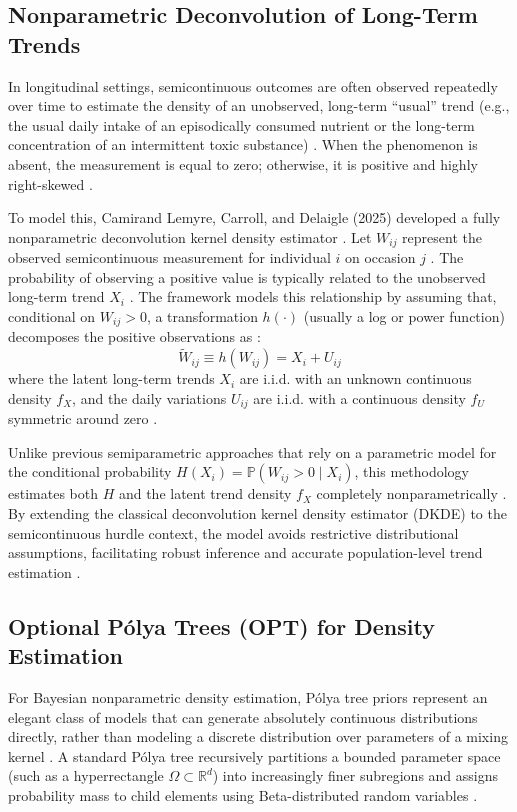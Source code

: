 \subsection{Nonparametric Deconvolution of Long-Term Trends}

In longitudinal settings, semicontinuous outcomes are often observed repeatedly over time to estimate the density of an unobserved, long-term ``usual'' trend (e.g., the usual daily intake of an episodically consumed nutrient or the long-term concentration of an intermittent toxic substance) \cite{lemyre2025}. When the phenomenon is absent, the measurement is equal to zero; otherwise, it is positive and highly right-skewed \cite{lemyre2025}.

To model this, Camirand Lemyre, Carroll, and Delaigle (2025) developed a fully nonparametric deconvolution kernel density estimator \cite{lemyre2025, delaigle2008}. Let $W_{ij}$ represent the observed semicontinuous measurement for individual $i$ on occasion $j$ \cite{lemyre2025}. The probability of observing a positive value is typically related to the unobserved long-term trend $X_i$ \cite{lemyre2025}. The framework models this relationship by assuming that, conditional on $W_{ij} > 0$, a transformation $h(\cdot)$ (usually a log or power function) decomposes the positive observations as \cite{lemyre2025}:
\[
\tilde{W}_{ij} \equiv h(W_{ij}) = X_i + U_{ij}
\]
where the latent long-term trends $X_i$ are i.i.d. with an unknown continuous density $f_X$, and the daily variations $U_{ij}$ are i.i.d. with a continuous density $f_U$ symmetric around zero \cite{lemyre2025}. 

Unlike previous semiparametric approaches that rely on a parametric model for the conditional probability $H(X_i) = \mathbb{P}(W_{ij} > 0 \mid X_i)$, this methodology estimates both $H$ and the latent trend density $f_X$ completely nonparametrically \cite{lemyre2025}. By extending the classical deconvolution kernel density estimator (DKDE) to the semicontinuous hurdle context, the model avoids restrictive distributional assumptions, facilitating robust inference and accurate population-level trend estimation \cite{lemyre2025}.

\subsection{Optional Pólya Trees (OPT) for Density Estimation}

For Bayesian nonparametric density estimation, Pólya tree priors represent an elegant class of models that can generate absolutely continuous distributions directly, rather than modeling a discrete distribution over parameters of a mixing kernel \cite{wong2010, ma2017}. A standard Pólya tree recursively partitions a bounded parameter space (such as a hyperrectangle $\Omega \subset \mathbb{R}^d$) into increasingly finer subregions and assigns probability mass to child elements using Beta-distributed random variables \cite{wong2010, ma2017}.


